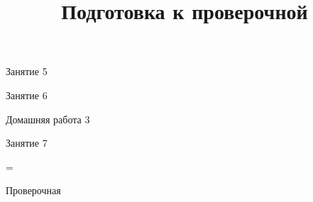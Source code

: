 \begin{class}[number=5]
	\begin{listofex}
		\item Занятие 5
	\end{listofex}
\end{class}

\begin{class}[number=6]
	\begin{listofex}
		\item Занятие 6
	\end{listofex}
\end{class}

\begin{homework}[number=3]
	\begin{listofex}
		\item Домашняя работа 3
	\end{listofex}
\end{homework}

\begin{class}[number=7]
	\title{Подготовка к проверочной}
	\begin{listofex}
		\item Занятие 7
	\end{listofex}
\end{class}

=%
\begin{exam}
	\begin{listofex}
		\item Проверочная
	\end{listofex}
\end{exam}
